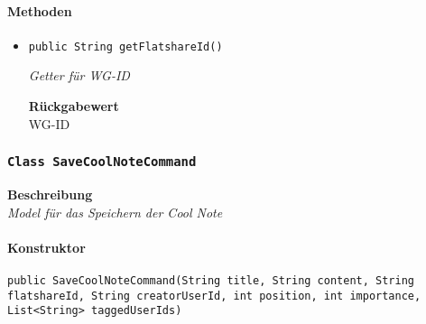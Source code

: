    \paragraph*{Methoden}
    \begin{itemize}
    	\item{\texttt{public String getFlatshareId()}}
    	
    	\textit{Getter für WG-ID}
    	
    	
    	
    	\textbf{Rückgabewert} \\
    	WG-ID
    \end{itemize}
    \subsubsection{\texttt{Class SaveCoolNoteCommand}}
    \textbf{Beschreibung} \\
    \textit{Model für das Speichern der Cool Note}
    \paragraph*{Konstruktor}
    \texttt{public SaveCoolNoteCommand(String title, String content, String flatshareId, String creatorUserId, int position, int importance, List<String> taggedUserIds)}
